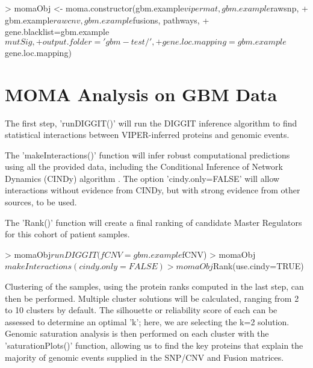 \documentclass{article}
\begin{document}
\par 
\linebreak

\begin{Schunk}
\begin{Sinput}
> momaObj <- moma.constructor(gbm.example$vipermat, gbm.example$rawsnp,
+         gbm.example$rawcnv, gbm.example$fusions, pathways,
+         gene.blacklist=gbm.example$mutSig,
+         output.folder='gbm-test/',
+         gene.loc.mapping=gbm.example$gene.loc.mapping)
\end{Sinput}
\end{Schunk}

\section{MOMA Analysis on GBM Data}

The first step, 'runDIGGIT()'  will run the DIGGIT inference algorithm \cite{diggit} to find
statistical interactions between VIPER-inferred proteins and genomic events.

\par
\linebreak

The 'makeInteractions()' function will infer robust computational predictions
using all the provided data, including the Conditional Inference of Network Dynamics 
(CINDy) algorithm \cite{cindy}.
The option 'cindy.only=FALSE' will allow interactions without evidence from CINDy, but 
with strong evidence from other
sources, to be used.

\par
\linebreak

The 'Rank()' function will create a final ranking of candidate Master Regulators for this cohort of patient samples.

\begin{Schunk}
\begin{Sinput}
> momaObj$runDIGGIT(fCNV=gbm.example$fCNV)
> momaObj$makeInteractions(cindy.only=FALSE)
> momaObj$Rank(use.cindy=TRUE)
\end{Sinput}
\end{Schunk}

\par
\linebreak

Clustering of the samples, using the protein ranks computed in the last step, can then be performed. Multiple cluster solutions will be calculated, ranging from 2 to 10 clusters by default. The silhouette or reliability score of each can be assessed to determine an optimal 'k'; here, we are selecting the k=2 solution. Genomic saturation analysis is then performed on each cluster with the 'saturationPlots()' function, allowing us to find the key proteins that explain the majority of genomic events supplied in the SNP/CNV and Fusion matrices.
\end{document}
